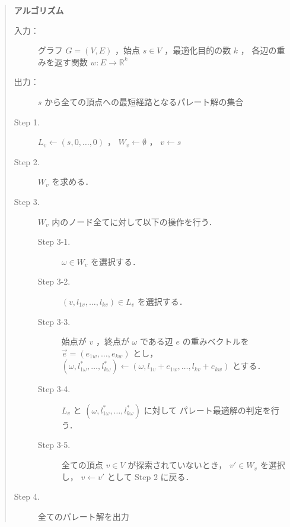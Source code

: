 \documentclass[12pt]{optlab-bachelor}
\begin{document}
\begin{quote}
  \textbf{アルゴリズム}
  \begin{description}
    \item[入力：] グラフ $G=(V,E)$ ，始点 $s \in V$ ，最適化目的の数 $k$ ，
    各辺の重みを返す関数 $w : E \to \mathbb{R}^k$
    \item[出力：] $s$ から全ての頂点への最短経路となるパレート解の集合
    \item[Step 1.] $L_v \leftarrow (s,0,\ldots,0)$ ，
    $W_v \leftarrow \emptyset$ ， $v \leftarrow s$
    \item[Step 2.] $W_v$ を求める．
    \item[Step 3.] $W_v$ 内のノード全てに対して以下の操作を行う．
    \begin{description}
      \item[Step 3-1.] $\omega \in W_v$ を選択する．
      \item[Step 3-2.] $(v,l_{1v},\ldots,l_{kv}) \in L_v$ を選択する．
      \item[Step 3-3.] 始点が $v$ ，終点が $\omega$ である辺 $e$ の重みベクトルを
      $\vec{e} = (e_{1w},\ldots,e_{kw})$ とし，
      $(\omega,l^*_{1\omega},\ldots,l^*_{k\omega}) \leftarrow
      (\omega,l_{1v}+e_{1w},\ldots,l_{kv}+e_{kw})$ とする．
      \item[Step 3-4.] $L_v$ と
      $(\omega,l^*_{1\omega},\ldots,l^*_{k\omega})$ に対して
      パレート最適解の判定を行う．
      \item[Step 3-5.] 全ての頂点 $v \in V$ が探索されていないとき，
      $v' \in W_v$ を選択し， $v \leftarrow v'$ として Step 2 に戻る．
    \end{description}
    \item[Step 4.] 全てのパレート解を出力
  \end{description}
\end{quote}
\end{document}
